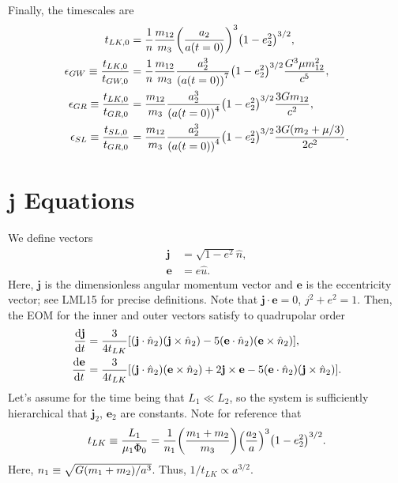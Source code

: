 \documentclass[11pt,
        usenames, %
        dvipsnames %
    ]{article}
\newcommand*{\rd}[2]{\frac{\mathrm{d}#1}{\mathrm{d}#2}}
\newcommand*{\bm}[1]{\boldsymbol{\mathbf{#1}}}
\DeclarePairedDelimiter\p{\lparen}{\rparen}
\DeclarePairedDelimiter\s{\lbrack}{\rbrack}
\begin{document}
Finally, the timescales are
\begin{align}
    t_{LK, 0} &= \frac{1}{n}
        \frac{m_{12}}{m_3}\p*{\frac{a_2}{a(t = 0)}}^3 \p*{1 - e_2^2}^{3/2},\\
    \epsilon_{GW} \equiv \frac{t_{LK, 0}}{t_{GW, 0}}
        &= \frac{1}{n}
            \frac{m_{12}}{m_3}\frac{a_2^3}{\p*{a(t = 0)}^7} \p*{1 - e_2^2}^{3/2}
            \frac{G^3 \mu m_{12}^2}{c^5},\\
    \epsilon_{GR} \equiv \frac{t_{LK, 0}}{t_{GR, 0}}
        &= \frac{m_{12}}{m_3}\frac{a_2^3}{\p*{a(t = 0)}^4} \p*{1 - e_2^2}^{3/2}
            \frac{3Gm_{12}}{c^2},\\
    \epsilon_{SL} \equiv \frac{t_{SL, 0}}{t_{GR, 0}}
        &= \frac{m_{12}}{m_3}\frac{a_2^3}{\p*{a(t = 0)}^4} \p*{1 - e_2^2}^{3/2}
            \frac{3G\p*{m_2 + \mu/3}}{2c^2}.
\end{align}

\appendix

\section{$\bm{j}$ Equations}

We define vectors
\begin{align}
    \bm{j} &= \sqrt{1 - e^2}\hat{n},\\
    \bm{e} &= e\hat{u}.
\end{align}
Here, $\bm{j}$ is the dimensionless angular momentum vector and $\bm{e}$ is the
eccentricity vector; see LML15 for precise definitions. Note that $\bm{j} \cdot
\bm{e} = 0$, $j^2 + e^2 = 1$. Then, the EOM for the inner and outer vectors
satisfy to quadrupolar order
\begin{align}
    \rd{\bm{j}}{t} &= \frac{3}{4t_{LK}} \s*{
        \p*{\bm{j} \cdot \hat{n}_2} \p*{\bm{j} \times \hat{n}_2}
        - 5\p*{\bm{e} \cdot \hat{n}_2}\p*{\bm{e} \times \hat{n}_2}
        },\\
    \rd{\bm{e}}{t} &= \frac{3}{4t_{LK}} \s*{
        \p*{\bm{j} \cdot \hat{n}_2} \p*{\bm{e} \times \hat{n}_2}
        + 2\bm{j} \times \bm{e}
        - 5\p*{\bm{e} \cdot \hat{n}_2}\p*{\bm{j} \times \hat{n}_2}
        }.
\end{align}
Let's assume for the time being that $L_1 \ll L_2$, so the system is
sufficiently hierarchical that $\bm{j}_2$, $\bm{e}_2$ are constants. Note for
reference that
\begin{equation}
    t_{LK} \equiv \frac{L_1}{\mu_1 \Phi_0}
        = \frac{1}{n_1}\p*{\frac{m_1 + m_2}{m_3}}
            \p*{\frac{a_2}{a}}^3
            \p*{1 - e_2^2}^{3/2}.
\end{equation}
Here, $n_1 \equiv \sqrt{G\p*{m_1 + m_2}/a^3}$. Thus, $1 / t_{LK} \propto
a^{3/2}$.
\end{document}
